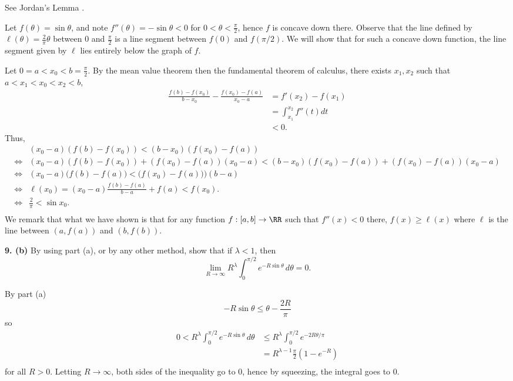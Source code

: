 \documentclass{homework}
\begin{document}
\begin{solution}
See Jordan's Lemma  \cite[p.~262]{brown04}.

Let $f(\theta) = \sin\theta$, and note $f''(\theta) = - \sin \theta < 0$ for $0< \theta < \frac \pi 2$, hence $f$ is concave down there.
Observe that the line defined by $\ell(\theta) = \frac 2\pi\theta $ between $0$ and $\frac \pi 2$ is a line segment between $f(0)$ and $f(\pi/2)$.  We will show that for such a concave down function, the line segment given by $\ell$ lies entirely below the graph of $f$.

Let $0=a<x_0<b=\frac \pi2$.  By the mean value theorem then the fundamental theorem of calculus, there exists $x_1,x_2$ such that $a<x_1<x_0<x_2<b$,
\begin{align*}
\frac{f(b) - f(x_0)}{b-x_0}- \frac{f(x_0) - f(a)}{x_0 - a} 
&= f'(x_2) - f(x_1)\\
&= \int_{x_1}^{x_2} f''(t)dt \\
&< 0.
\end{align*}
Thus, 
{\small
\begin{align*} 
      & (x_0 - a)(f(b) - f(x_0)) < (b-x_0)(f(x_0) - f(a))\\
  \iff&  (x_0 - a)(f(b) - f(x_0)) + (f(x_0) - f(a))(x_0 - a)< (b-x_0)(f(x_0) - f(a))+ (f(x_0) - f(a))(x_0 - a)\\
  \iff&  (x_0 - a)\Big(f(b) - f(a)\Big)< \Big(f(x_0) - f(a)\Big))(b - a)\\
  \iff&  \ell(x_0) = (x_0 - a)\frac{f(b) - f(a)}{b - a} + f(a)< f(x_0).\\
  \iff&  \frac 2\pi < \sin x_0.\\
\end{align*}
}
We remark that what we have shown is that for any function $f:[a,b] \to \RR$ such that $f''(x) <0$ there, $f(x) \ge \ell(x)$ where $\ell$ is the line between $(a,f(a))$ and $(b,f(b))$.
\end{solution}

{\bf 9. (b)} By using part (a), or by any other method, show that if $\lambda < 1$, then
$$
  \lim_{R\to\infty} R^\lambda \int_0^{\pi/2} e^{-R\sin\theta}\,d\theta = 0.
$$

\begin{solution}
  By part (a)
  $$
   -R\sin \theta \le \theta -\frac{2R}{\pi} 
  $$
  so
  \begin{align*}
  0 < R^{\lambda}\int_0^{\pi/2} e^{-R\sin\theta}\,d\theta 
  &\le R^{\lambda}\int_0^{\pi/2} e^{-2R\theta/\pi}\\
  &= R^{\lambda-1} \frac{\pi}{2}(1-e^{-R})\\
  \end{align*}
  for all $R>0$.  Letting $R\to \infty$, both sides of the inequality go to $0$, hence by squeezing, the integral goes to $0$.
\end{solution}
\end{document}
